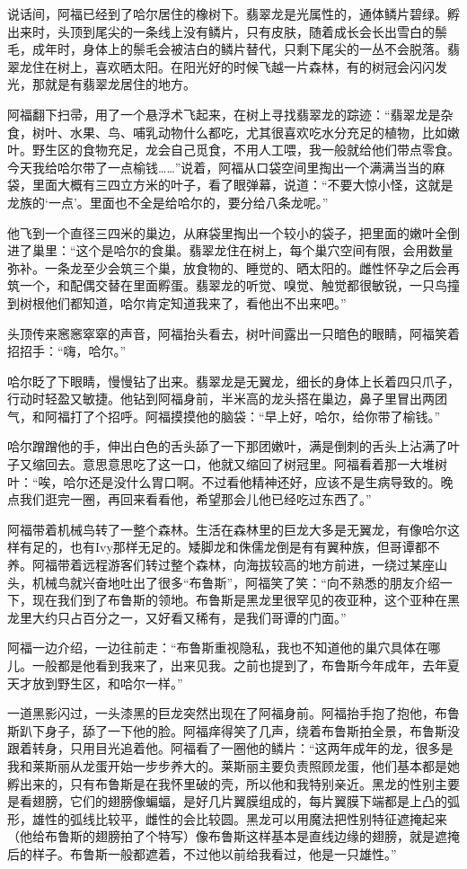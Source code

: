 \documentclass[../main.tex]{subfiles}
\begin{document}
说话间，阿福已经到了哈尔居住的橡树下。翡翠龙是光属性的，通体鳞片碧绿。孵出来时，头顶到尾尖的一条线上没有鳞片，只有皮肤，随着成长会长出雪白的鬃毛，成年时，身体上的鬃毛会被洁白的鳞片替代，只剩下尾尖的一丛不会脱落。翡翠龙住在树上，喜欢晒太阳。在阳光好的时候飞越一片森林，有的树冠会闪闪发光，那就是有翡翠龙居住的地方。

阿福翻下扫帚，用了一个悬浮术飞起来，在树上寻找翡翠龙的踪迹：“翡翠龙是杂食，树叶、水果、鸟、哺乳动物什么都吃，尤其很喜欢吃水分充足的植物，比如嫩叶。野生区的食物充足，龙会自己觅食，不用人工喂，我一般就给他们带点零食。今天我给哈尔带了一点榆钱……”说着，阿福从口袋空间里掏出一个满满当当的麻袋，里面大概有三四立方米的叶子，看了眼弹幕，说道：“不要大惊小怪，这就是龙族的`一点'。里面也不全是给哈尔的，要分给八条龙呢。”

他飞到一个直径三四米的巢边，从麻袋里掏出一个较小的袋子，把里面的嫩叶全倒进了巢里：“这个是哈尔的食巢。翡翠龙住在树上，每个巢穴空间有限，会用数量弥补。一条龙至少会筑三个巢，放食物的、睡觉的、晒太阳的。雌性怀孕之后会再筑一个，和配偶交替在里面孵蛋。翡翠龙的听觉、嗅觉、触觉都很敏锐，一只鸟撞到树根他们都知道，哈尔肯定知道我来了，看他出不出来吧。”

头顶传来窸窸窣窣的声音，阿福抬头看去，树叶间露出一只暗色的眼睛，阿福笑着招招手：“嗨，哈尔。”

哈尔眨了下眼睛，慢慢钻了出来。翡翠龙是无翼龙，细长的身体上长着四只爪子，行动时轻盈又敏捷。他钻到阿福身前，半米高的龙头搭在巢边，鼻子里冒出两团气，和阿福打了个招呼。阿福摸摸他的脑袋：“早上好，哈尔，给你带了榆钱。”

哈尔蹭蹭他的手，伸出白色的舌头舔了一下那团嫩叶，满是倒刺的舌头上沾满了叶子又缩回去。意思意思吃了这一口，他就又缩回了树冠里。阿福看着那一大堆树叶：“唉，哈尔还是没什么胃口啊。不过看他精神还好，应该不是生病导致的。晚点我们逛完一圈，再回来看看他，希望那会儿他已经吃过东西了。”

阿福带着机械鸟转了一整个森林。生活在森林里的巨龙大多是无翼龙，有像哈尔这样有足的，也有Ivy那样无足的。矮脚龙和侏儒龙倒是有有翼种族，但哥谭都不养。阿福带着远程游客们转过整个森林，向海拔较高的地方前进，一绕过某座山头，机械鸟就兴奋地吐出了很多“布鲁斯”，阿福笑了笑：“向不熟悉的朋友介绍一下，现在我们到了布鲁斯的领地。布鲁斯是黑龙里很罕见的夜亚种，这个亚种在黑龙里大约只占百分之一，又好看又稀有，是我们哥谭的门面。”

阿福一边介绍，一边往前走：“布鲁斯重视隐私，我也不知道他的巢穴具体在哪儿。一般都是他看到我来了，出来见我。之前也提到了，布鲁斯今年成年，去年夏天才放到野生区，和哈尔一样。”

一道黑影闪过，一头漆黑的巨龙突然出现在了阿福身前。阿福抬手抱了抱他，布鲁斯趴下身子，舔了一下他的脸。阿福痒得笑了几声，绕着布鲁斯拍全景，布鲁斯没跟着转身，只用目光追着他。阿福看了一圈他的鳞片：“这两年成年的龙，很多是我和莱斯丽从龙蛋开始一步步养大的。莱斯丽主要负责照顾龙蛋，他们基本都是她孵出来的，只有布鲁斯是在我怀里破的壳，所以他和我特别亲近。黑龙的性别主要是看翅膀，它们的翅膀像蝙蝠，是好几片翼膜组成的，每片翼膜下端都是上凸的弧形，雄性的弧线比较平，雌性的会比较圆。黑龙可以用魔法把性别特征遮掩起来（他给布鲁斯的翅膀拍了个特写）像布鲁斯这样基本是直线边缘的翅膀，就是遮掩后的样子。布鲁斯一般都遮着，不过他以前给我看过，他是一只雄性。”
\end{document}
